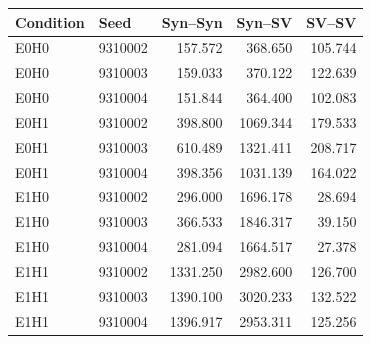 \documentclass[11pt,letterpaper]{article}
\begin{document}
\begin{center}\small
\begin{tabular}{llrrr}
\toprule
Condition & Seed & Syn--Syn & Syn--SV & SV--SV \\ \midrule
E0H0 & 9310002 & 157.572 & 368.650 & 105.744 \\
E0H0 & 9310003 & 159.033 & 370.122 & 122.639 \\
E0H0 & 9310004 & 151.844 & 364.400 & 102.083 \\
E0H1 & 9310002 & 398.800 & 1069.344 & 179.533 \\
E0H1 & 9310003 & 610.489 & 1321.411 & 208.717 \\
E0H1 & 9310004 & 398.356 & 1031.139 & 164.022 \\
E1H0 & 9310002 & 296.000 & 1696.178 & 28.694 \\
E1H0 & 9310003 & 366.533 & 1846.317 & 39.150 \\
E1H0 & 9310004 & 281.094 & 1664.517 & 27.378 \\
E1H1 & 9310002 & 1331.250 & 2982.600 & 126.700 \\
E1H1 & 9310003 & 1390.100 & 3020.233 & 132.522 \\
E1H1 & 9310004 & 1396.917 & 2953.311 & 125.256 \\
\bottomrule\end{tabular}\end{center}
\clearpage
\end{document}
